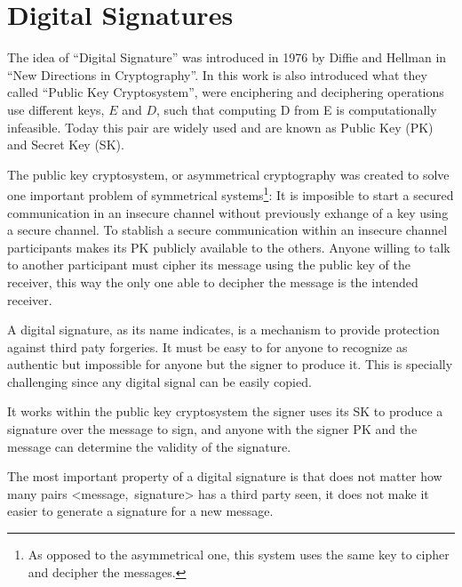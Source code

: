 \section{Digital Signatures}
The idea of ``Digital Signature'' was introduced in 1976 by Diffie and
  Hellman in ``New Directions in Cryptography''\cite{diffie1976new}. In this
  work is also introduced what they called ``Public Key Cryptosystem'', were
  enciphering and deciphering operations use different keys, $E$ and $D$, such
  that computing D from E is computationally infeasible. Today this pair are
  widely used and are known as Public Key (PK) and Secret Key (SK).

The public key cryptosystem, or asymmetrical cryptography was created to solve
  one important problem of symmetrical systems\footnote{As opposed to the
  asymmetrical one, this system uses the same key to cipher and decipher
  the messages.}: It is imposible to start a secured communication in an
  insecure channel without previously exhange of a key using a secure channel.
To stablish a secure communication within an insecure channel participants
  makes its PK publicly available to the others. Anyone willing to talk to
  another participant must cipher its message using the public key of the
  receiver, this way the only one able to decipher the message is the intended
  receiver.

A digital signature, as its name indicates, is a mechanism to provide protection
  against third paty forgeries. It must be easy to for anyone to recognize as
  authentic but impossible for anyone but the signer to produce it. This is
  specially challenging since any digital signal can be easily copied.

It works within the public key cryptosystem the signer uses its SK to produce
  a signature over the message to sign, and anyone with the signer PK and the
  message can determine the validity of the signature.

The most important property of a digital signature is that does not matter how
  many pairs \mbox{\textless message, signature\textgreater} has a third party
  seen, it does not make it easier to generate a signature for a new message.
